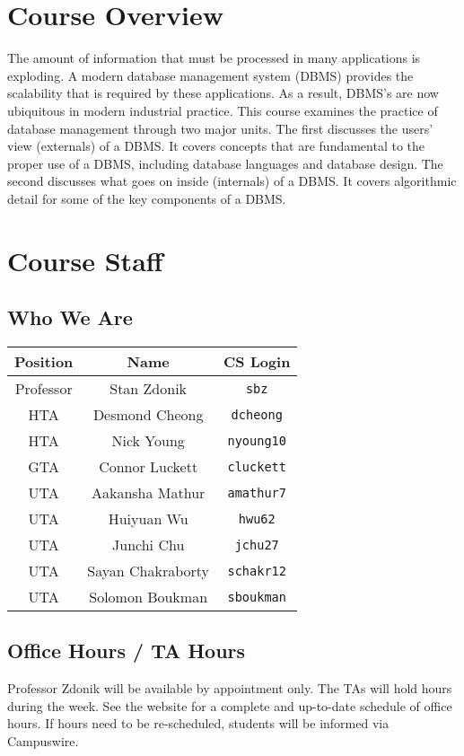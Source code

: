 \documentclass{article}
\begin{document}
\section{Course Overview}
The amount of information that must be processed in many applications is exploding. A modern database management system (DBMS) provides the scalability that is required by these applications. As a result, DBMS’s are now ubiquitous in modern industrial practice. This course examines the practice of database management through two major units. The first discusses the users’ view (externals) of a DBMS. It covers concepts that are fundamental to the proper use of a DBMS, including database languages and database design. The second discusses what goes on inside (internals) of a DBMS. It covers algorithmic detail for some of the key components of a DBMS.


\section{Course Staff}
\subsection{Who We Are}
\begin{center}
\begin{tabular}{ | c | c | c | }
    \hline
    \textbf{Position} & \textbf{Name} & \textbf{CS Login} \\
    \hline\hline
    Professor & Stan Zdonik & \texttt{sbz} \\
    HTA & Desmond Cheong & \texttt{dcheong} \\
    HTA & Nick Young & \texttt{nyoung10} \\
    GTA & Connor Luckett & \texttt{cluckett} \\
    UTA & Aakansha Mathur & \texttt{amathur7} \\
    UTA & Huiyuan Wu & \texttt{hwu62} \\
    UTA & Junchi Chu & \texttt{jchu27} \\
    UTA & Sayan Chakraborty & \texttt{schakr12} \\
    UTA & Solomon Boukman & \texttt{sboukman} \\
    \hline
\end{tabular}
\end{center}

\subsection{Office Hours / TA Hours}
Professor Zdonik will be available by appointment only. The TAs will hold hours during the week. See the website for a complete and up-to-date schedule of office hours. If hours need to be re-scheduled, students will be informed via Campuswire.
\end{document}
